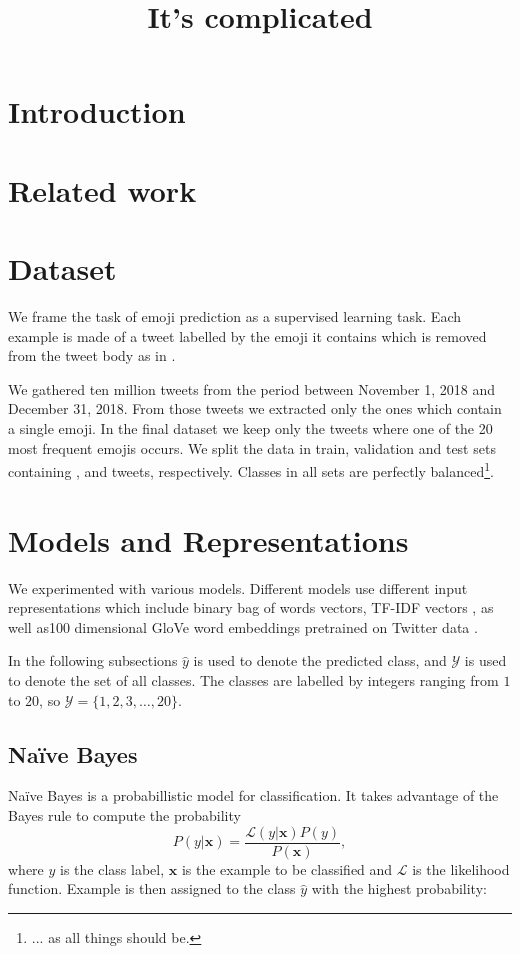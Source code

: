 \documentclass[10pt, a4paper]{article}
\title{It's complicated \emoji{1F384}}
\begin{document}
\maketitleabstract

\section{Introduction}

\section{Related work}

\section{Dataset}

We frame the task of emoji prediction as a supervised learning task. Each 
example is made of a tweet labelled by the emoji it contains which is removed 
from the tweet body as in \citep{barbieri2017emojis}. 

We gathered ten million tweets from the period between November 1, 2018 and 
December 31, 2018. From those tweets we extracted only the ones which contain a 
single emoji. In the final dataset we keep only the tweets where one of the 20 
most frequent emojis occurs. We split the data in train, validation and test 
sets containing ,  and  tweets,
respectively. Classes in all sets are perfectly balanced\footnote{... as all 
things should be.}.

\section{Models and Representations}

We experimented with various models. Different models use different input 
representations which include binary bag of words vectors, TF-IDF vectors 
\citep{manning2008introduction}, as well as100 dimensional GloVe word embeddings
pretrained on Twitter data \citep{pennington2014glove}.

In the following subsections $\hat{y}$ is used to denote the predicted class, 
and $\mathcal{Y}$ is used to denote the set of all classes. The classes are 
labelled by integers ranging from $1$ to $20$, so $\mathcal{Y} = \{1, 2, 3,
\ldots, 20\}$.

\subsection{Na\"{i}ve Bayes}

Na\"{i}ve Bayes \citep{manning2008introduction} is a probabillistic model for 
classification. It takes advantage of the Bayes rule to compute the probability 
$$P(y|\mathbf{x}) = \frac{\mathcal{L}(y|\mathbf{x}) P(y)}{P(\mathbf{x})},$$
where $y$ is the class label, $\mathbf{x}$ is the example to be classified and 
$\mathcal{L}$ is the likelihood function. Example is then assigned to the class 
$\hat{y}$ with the highest probability:
\end{document}
